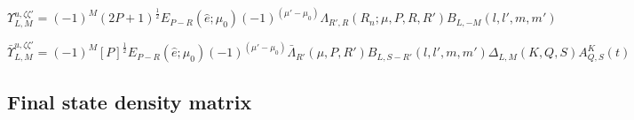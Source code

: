\documentclass[10pt]{article}
\begin{document}



\begin{equation}
\varUpsilon_{L,M}^{u,\zeta\zeta'}=(-1)^{M}(2P+1)^{\frac{1}{2}}E_{P-R}(\hat{e};\mu_{0})(-1)^{(\mu'-\mu_{0})}\Lambda_{R',R}(R_{\hat{n}};\mu,P,R,R')B_{L,-M}(l,l',m,m')
\label{eq:channel-func-defn-MF}
\end{equation}

\begin{equation}
\bar{\varUpsilon}_{L,M}^{u,\zeta\zeta'}=(-1)^{M}[P]^{\frac{1}{2}}E_{P-R}(\hat{e};\mu_{0})(-1)^{(\mu'-\mu_{0})}\bar{\Lambda}_{R'}(\mu,P,R')B_{L,S-R'}(l,l',m,m')\Delta_{L,M}(K,Q,S)A_{Q,S}^{K}(t)
\label{eq:channel-func-defn-AF}
\end{equation}






\subsection{Final state density matrix\label{sec:density-mat-full}}



\end{document}

